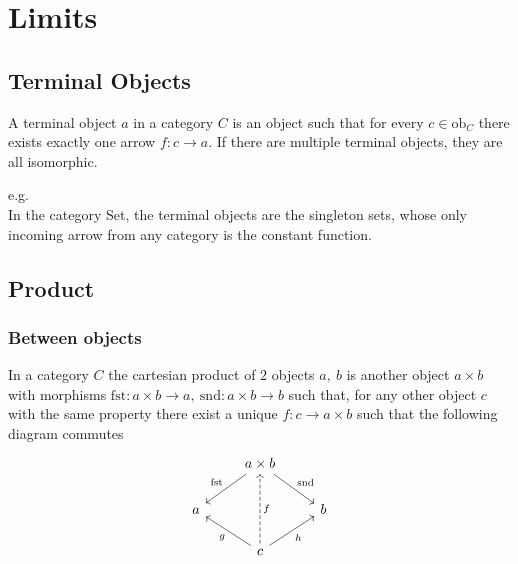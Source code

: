 \section{Limits}

\subsection{Terminal Objects}
A terminal object $a$ in a category $C$ is an object such that for every
$c\in \mathrm{ob}_C$ there exists exactly one arrow $f: c\to a$. If there are
multiple terminal objects, they are all isomorphic.

e.g.\\
In the category Set, the terminal objects are the singleton sets, whose only
incoming arrow from any category is the constant function.

\subsection{Product}
\subsubsection{Between objects}
\cite{nlab:cartesian_product}
In a category $C$ the cartesian product of $2$ objects $a,\ b$ is another
object $a\times b$ with morphisms $\mathrm{fst}: a\times b \to a,
\ \mathrm{snd}: a\times b \to b$ such that, for any other object $c$ with the
same property there exist a unique $f:c \to a\times b$ such that the following
diagram commutes
\[\begin{tikzcd}
	& {a\times b} \\
	a && b \\
	& c
	\arrow["{\mathrm{fst}}"', from=1-2, to=2-1]
	\arrow["{\mathrm{snd}}", from=1-2, to=2-3]
	\arrow["f"', dashed, from=3-2, to=1-2]
	\arrow["g", from=3-2, to=2-1]
	\arrow["h"', from=3-2, to=2-3]
\end{tikzcd}\]

